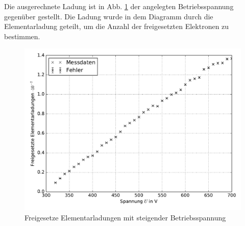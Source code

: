 Die ausgerechnete Ladung ist in Abb. \ref{fig:Ladung Spannung} der angelegten
Betriebsspannung gegenüber gestellt. Die Ladung wurde in dem Diagramm durch
die Elementarladung geteilt, um die Anzahl der freigesetzten Elektronen
zu bestimmen.

%
%
%
%
%
%

\begin{figure}
  \centering
  \includegraphics[width=\textwidth]{Spannung_Ladung.pdf}
  \caption{Freigesetze Elementarladungen mit steigender Betriebsspannung}
  \label{fig:Ladung Spannung}
\end{figure}

